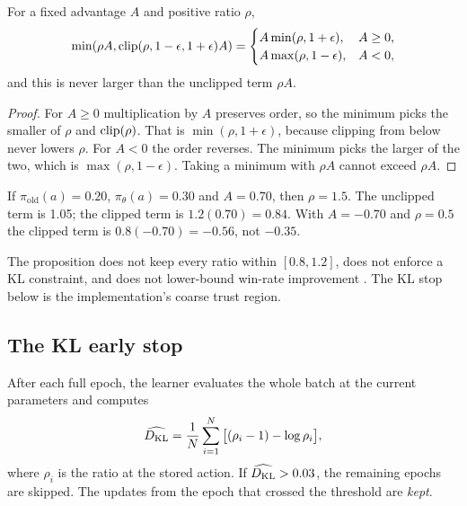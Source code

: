 \begin{proposition}
\label{prop:clip}
For a fixed advantage $A$ and positive ratio $\rho$,
\[
  \min(\rho A,\operatorname{clip}(\rho,1-\epsilon,1+\epsilon)A)=
  \begin{cases}A\min(\rho,1+\epsilon),&A\ge0,\\A\max(\rho,1-\epsilon),&A<0,\end{cases}
\]
and this is never larger than the unclipped term $\rho A$.
\end{proposition}
\begin{proof}
For $A\ge0$ multiplication by $A$ preserves order, so the minimum picks the
smaller of $\rho$ and $\operatorname{clip}(\rho)$. That is $\min(\rho,1+\epsilon)$, because
clipping from below never lowers $\rho$. For $A<0$ the order reverses. The
minimum picks the larger of the two, which is $\max(\rho,1-\epsilon)$. Taking
a minimum with $\rho A$ cannot exceed $\rho A$.
\end{proof}

\begin{example}
If $\pi_{\mathrm{old}}(a)=0.20$, $\pi_\theta(a)=0.30$ and $A=0.70$, then
$\rho=1.5$. The unclipped term is 1.05; the clipped term is
$1.2(0.70)=0.84$. With $A=-0.70$ and $\rho=0.5$ the clipped term is
$0.8(-0.70)=-0.56$, not $-0.35$.
\end{example}

The proposition does not keep every ratio within $[0.8,1.2]$, does not enforce
a KL constraint, and does not lower-bound win-rate improvement
\citep{ppo,trpo}. The KL stop below is the implementation's coarse trust
region.

\subsection{The KL early stop}
After each full epoch, the learner evaluates the whole batch at the current
parameters and computes
\begin{equation}
  \widehat{D_{\mathrm{KL}}}=\frac1N\sum_{i=1}^N\big[(\rho_i-1)-\log\rho_i\big],
  \label{eq:k3}
\end{equation}
where $\rho_i$ is the ratio at the stored action. If $\widehat{D_{\mathrm{KL}}}>0.03$, the
remaining epochs are skipped. The updates from the epoch that crossed the
threshold are \emph{kept}.

